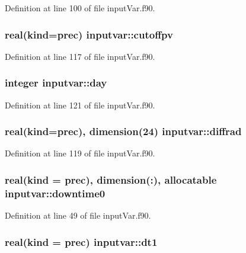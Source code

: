 Definition at line 100 of file input\-Var.\-f90.

\hypertarget{classinputvar_ab8f560a60d07ea2ec86b99b42e799877}{
\subsubsection[{cutoffpv}]{\setlength{\rightskip}{0pt plus 5cm}real(kind=prec) inputvar\-::cutoffpv}}\label{classinputvar_ab8f560a60d07ea2ec86b99b42e799877}


Definition at line 117 of file input\-Var.\-f90.

\hypertarget{classinputvar_af0f2faabf3f021accc56491cdcf43db5}{
\subsubsection[{day}]{\setlength{\rightskip}{0pt plus 5cm}integer inputvar\-::day}}\label{classinputvar_af0f2faabf3f021accc56491cdcf43db5}


Definition at line 121 of file input\-Var.\-f90.

\hypertarget{classinputvar_a29749af38c4932d37115166f23b769a3}{
\subsubsection[{diffrad}]{\setlength{\rightskip}{0pt plus 5cm}real(kind=prec), dimension(24) inputvar\-::diffrad}}\label{classinputvar_a29749af38c4932d37115166f23b769a3}


Definition at line 119 of file input\-Var.\-f90.

\hypertarget{classinputvar_aaab84ab253f188eacce25a200a4ab300}{
\subsubsection[{downtime0}]{\setlength{\rightskip}{0pt plus 5cm}real(kind = prec), dimension(\-:), allocatable inputvar\-::downtime0}}\label{classinputvar_aaab84ab253f188eacce25a200a4ab300}


Definition at line 49 of file input\-Var.\-f90.

\hypertarget{classinputvar_a62c9f9492040ef5e03091380533f2c0f}{
\subsubsection[{dt1}]{\setlength{\rightskip}{0pt plus 5cm}real(kind = prec) inputvar\-::dt1}}\label{classinputvar_a62c9f9492040ef5e03091380533f2c0f}


